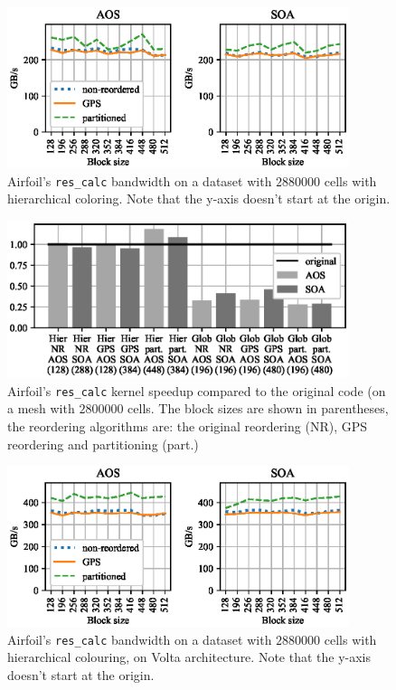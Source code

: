 \begin{figure}[Htbp]
\centering
\includegraphics[width=10cm]{fig/airfoil_bw-vs-bs_hier_large.eps}
\caption{Airfoil's \texttt{res\_calc} bandwidth on a dataset with $2880000$ 
cells with hierarchical coloring. Note that the y-axis doesn't start at the 
origin.} \label{fig:airfoil_bw-vs-bs_hier_large}
\end{figure}

\begin{figure}[Htbp]
\centering
\includegraphics[width=10cm]{fig/airfoil_speedup_large.eps}
\caption{Airfoil's \texttt{res\_calc} kernel speedup compared to the original 
code (on a mesh with $2800000$ cells. The block sizes are shown in parentheses, 
the reordering algorithms are: the original reordering (NR), GPS reordering and 
partitioning (part.)}
\label{fig:airfoil_speedup_large}
\end{figure}



\begin{figure}[Htbp]
\centering
\includegraphics[width=10cm]{fig/airfoil_bw-vs-bs_hier_large_volta.eps}
\caption{Airfoil's \texttt{res\_calc} bandwidth on a dataset with $2880000$ 
cells with hierarchical colouring, on Volta architecture. Note that the 
y-axis doesn't start at the origin.} 
\label{fig:airfoil_bw-vs-bs_hier_large_volta}
\end{figure}


